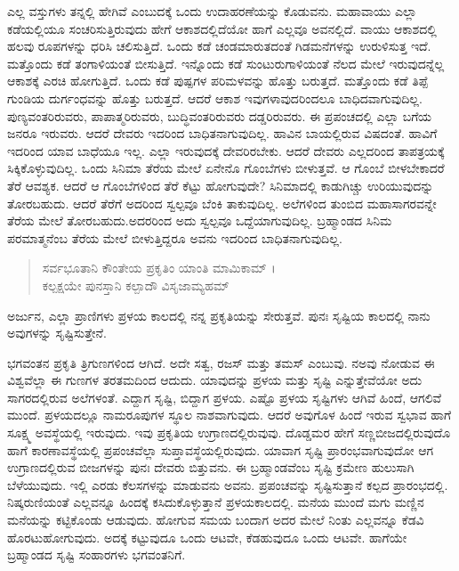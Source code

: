 ಎಲ್ಲ ವಸ್ತುಗಳು ತನ್ನಲ್ಲಿ ಹೇಗಿವೆ ಎಂಬುದಕ್ಕೆ ಒಂದು ಉದಾಹರಣೆಯನ್ನು ಕೊಡುವನು. ಮಹಾವಾಯು ಎಲ್ಲಾ ಕಡೆಯಲ್ಲಿಯೂ ಸಂಚರಿಸುತ್ತಿರುವುದು ಹೇಗೆ ಆಕಾಶದಲ್ಲಿದೆಯೋ ಹಾಗೆ ಎಲ್ಲವೂ ಅವನಲ್ಲಿದೆ. ವಾಯು ಆಕಾಶದಲ್ಲಿ ಹಲವು ರೂಪಗಳನ್ನು ಧರಿಸಿ ಚಲಿಸುತ್ತಿದೆ. ಒಂದು ಕಡೆ ಚಂಡಮಾರುತದಂತೆ ಗಿಡಮನೆಗಳನ್ನು ಉರುಳಿಸುತ್ತ ಇದೆ. ಮತ್ತೊಂದು ಕಡೆ ತಂಗಾಳಿಯಂತೆ ಬೀಸುತ್ತಿದೆ. ಇನ್ನೊಂದು ಕಡೆ ಸುಂಟುರುಗಾಳಿಯಂತೆ ನೆಲದ ಮೇಲೆ ಇರುವುದನ್ನೆಲ್ಲ ಆಕಾಶಕ್ಕೆ ಎರಚಿ ಹೋಗುತ್ತಿದೆ. ಒಂದು ಕಡೆ ಪುಷ್ಪಗಳ ಪರಿಮಳವನ್ನು ಹೊತ್ತು ಬರುತ್ತದೆ. ಮತ್ತೊಂದು ಕಡೆ ತಿಪ್ಪೆ ಗುಂಡಿಯ ದುರ್ಗಂಧವನ್ನು ಹೊತ್ತು ಬರುತ್ತದೆ. ಆದರೆ ಆಕಾಶ ಇವುಗಳಾವುದರಿಂದಲೂ ಬಾಧಿದವಾಗುವುದಿಲ್ಲ. ಪುಣ್ಯವಂತರಿರುವರು, ಪಾಪಾತ್ಮರಿರುವರು, ಬುದ್ಧಿವಂತರಿರುವರು ದಡ್ಡರಿರುವರು. ಈ ಪ್ರಪಂಚದಲ್ಲಿ ಎಲ್ಲಾ ಬಗೆಯ ಜನರೂ ಇರುವರು. ಆದರೆ ದೇವರು ಇದರಿಂದ ಬಾಧಿತನಾಗುವುದಿಲ್ಲ. ಹಾವಿನ ಬಾಯಲ್ಲಿರುವ ವಿಷದಂತೆ. ಹಾವಿಗೆ ಇದರಿಂದ ಯಾವ ಬಾಧೆಯೂ ಇಲ್ಲ. ಎಲ್ಲಾ ಇರುವುದಕ್ಕೆ ದೇವರಿರಬೇಕು. ಆದರೆ ದೇವರು ಎಲ್ಲದರಿಂದ ತಾಪತ್ರಯಕ್ಕೆ ಸಿಕ್ಕಿಕೊಳ್ಳುವುದಿಲ್ಲ. ಒಂದು ಸಿನಿಮಾ ತೆರೆಯ ಮೇಲೆ ಏನೇನೊ ಗೊಂಬೆಗಳು ಬೀಳುತ್ತವೆ. ಆ ಗೊಂಬೆ ಬೀಳಬೇಕಾದರೆ ತೆರೆ ಆವಶ್ಯಕ. ಆದರೆ ಆ ಗೊಂಬೆಗಳಿಂದ ತೆರೆ ಕೆಟ್ಟು ಹೋಗುವುದೇ? ಸಿನಿಮಾದಲ್ಲಿ ಕಾಡುಗಿಚ್ಚು ಉರಿಯುವುದನ್ನು ತೋರಬಹುದು. ಆದರೆ ತೆರೆಗೆ ಅದರಿಂದ ಸ್ವಲ್ಪವೂ ಬೆಂಕಿ ತಾಕುವುದಿಲ್ಲ. ಅಲೆಗಳಿಂದ ತುಂಬಿದ ಮಹಾಸಾಗರವನ್ನೇ ತೆರೆಯ ಮೇಲೆ ತೋರಬಹುದು.ಅದರರಿಂದ ಅದು ಸ್ವಲ್ಪವೂ ಒದ್ದೆಯಾಗುವುದಿಲ್ಲ. ಬ್ರಹ್ಮಾಂಡದ ಸಿನಿಮ ಪರಮಾತ್ಮನೆಂಬ ತೆರೆಯ ಮೇಲೆ ಬೀಳುತ್ತಿದ್ದರೂ ಅವನು ಇದರಿಂದ ಬಾಧಿತನಾಗುವುದಿಲ್ಲ.

\begin{verse}
ಸರ್ವಭೂತಾನಿ ಕೌಂತೇಯ ಪ್ರಕೃತಿಂ ಯಾಂತಿ ಮಾಮಿಕಾಮ್ ।\\ಕಲ್ಪಕ್ಷಯೇ ಪುನಸ್ತಾನಿ ಕಲ್ಪಾದೌ ವಿಸೃಜಾಮ್ಯಹಮ್ 
\end{verse}

ಅರ್ಜುನ, ಎಲ್ಲಾ ಪ್ರಾಣಿಗಳು ಪ್ರಳಯ ಕಾಲದಲ್ಲಿ ನನ್ನ ಪ್ರಕೃತಿಯನ್ನು ಸೇರುತ್ತವೆ. ಪುನಃ ಸೃಷ್ಟಿಯ ಕಾಲದಲ್ಲಿ ನಾನು ಅವುಗಳನ್ನು ಸೃಷ್ಟಿಸುತ್ತೇನೆ.

ಭಗವಂತನ ಪ್ರಕೃತಿ ತ್ರಿಗುಣಗಳಿಂದ ಆಗಿದೆ. ಅದೇ ಸತ್ವ, ರಜಸ್ ಮತ್ತು ತಮಸ್ ಎಂಬುವು. ನಅವು ನೋಡುವ ಈ ವಿಶ್ವವೆಲ್ಲಾ ಈ ಗುಣಗಳ ತರತಮದಿಂದ ಆದುದು. ಯಾವುದನ್ನು ಪ್ರಳಯ ಮತ್ತು ಸೃಷ್ಟಿ ಎನ್ನುತ್ತೇವೆಯೋ ಅದು ಸಾಗರದಲ್ಲಿರುವ ಅಲೆಗಳಂತೆ. ಎದ್ದಾಗ ಸೃಷ್ಟಿ, ಬಿದ್ದಾಗ ಪ್ರಳಯ. ಎಷ್ಟೊ ಪ್ರಳಯ ಸೃಷ್ಟಿಗಳು ಆಗಿವೆ ಹಿಂದೆ, ಆಗಲಿವೆ ಮುಂದೆ. ಪ್ರಳಯದಲ್ಲೂ ನಾಮರೂಪುಗಳ ಸ್ಥೂಲ ನಾಶವಾಗುವುದು. ಆದರೆ ಅವುಗೊಳ ಹಿಂದೆ ಇರುವ ಸ್ವಭಾವ ಹಾಗೆ ಸೂಕ್ಷ್ಮ ಅವಸ್ಥೆಯಲ್ಲಿ ಇರುವುದು. ಇವು ಪ್ರಕೃತಿಯ ಉಗ್ರಾಣದಲ್ಲಿರುವುವು. ದೊಡ್ಡಮರ ಹೇಗೆ ಸಣ್ಣಬೀಜದಲ್ಲಿರುವುದೊ ಹಾಗೆ ಕಾರಣಾವಸ್ಥೆಯಲ್ಲಿ ಪ್ರಪಂಚವೆಲ್ಲಾ ಸುಪ್ತಾವಸ್ಥೆಯಲ್ಲಿರುವುದು. ಯಾವಾಗ ಸೃಷ್ಟಿ ಪ್ರಾರಂಭವಾಗುವುದೋ ಆಗ ಉಗ್ರಾಣದಲ್ಲಿರುವ ಬೀಜಗಳನ್ನು ಪುನಃ ದೇವರು ಬಿತ್ತುವನು. ಈ ಬ್ರಹ್ಮಾಂಡವೆಂಬ ಸೃಷ್ಟಿ ಕ್ರಮೇಣ ಹುಲುಸಾಗಿ ಬೆಳೆಯುವುದು. ಇಲ್ಲಿ ಎರಡು ಕೆಲಸಗಳನ್ನು ಮಾಡುವನು ಅವನು. ಪ್ರಪಂಚವನ್ನು ಸೃಷ್ಟಿಸುತ್ತಾನೆ ಕಲ್ಪದ ಪ್ರಾರಂಭದಲ್ಲಿ. ನಿಷ್ಕರುಣಿಯಂತೆ ಎಲ್ಲವನ್ನೂ ಹಿಂದಕ್ಕೆ ಕಸಿದುಕೊಳ್ಳುತ್ತಾನೆ ಪ್ರಳಯಕಾಲದಲ್ಲಿ. ಮನೆಯ ಮುಂದೆ ಮಗು ಮಣ್ಣಿನ ಮನೆಯನ್ನು ಕಟ್ಟಿಕೊಂಡು ಆಡುವುದು. ಹೋಗುವ ಸಮಯ ಬಂದಾಗ ಅದರ ಮೇಲೆ ನಿಂತು ಎಲ್ಲವನ್ನೂ ಕೆಡವಿ ಹೊರಟುಹೋಗುವುದು. ಅದಕ್ಕೆ ಕಟ್ಟುವುದೂ ಒಂದು ಆಟವೇ, ಕೆಡಹುವುದೂ ಒಂದು ಆಟವೇ. ಹಾಗೆಯೇ ಬ್ರಹ್ಮಾಂಡದ ಸೃಷ್ಟಿ ಸಂಹಾರಗಳು ಭಗವಂತನಿಗೆ.

